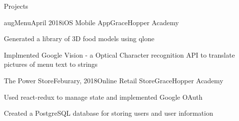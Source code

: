 \documentclass{resume} %
\begin{document}
    \begin{rSection}{Projects}
    \begin{rSubsection}{augMenu}{April 2018}{iOS Mobile App}{GraceHopper Academy}
    \item Generated a library of 3D food models using qlone
    \item Implmented Google Vision - a Optical Character recognition API to translate pictures of menu text to strings 
    \end{rSubsection}
    \begin{rSubsection}{The Power Store}{Feburary, 2018}{Online Retail Store}{GraceHopper Academy}
        \item Used react-redux to manage state and implemented Google OAuth
        \item Created a PostgreSQL database for storing users and user information
        \end{rSubsection}
    \end{rSection}
    
    
    
    
\end{document}

